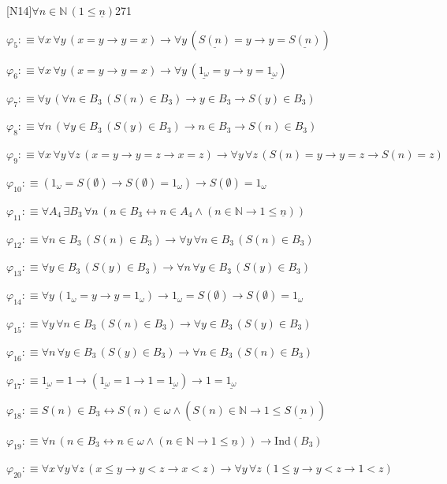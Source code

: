\begin{fullproof}{[N14]}{$\forall n \in \mathbb{N}\,(1 \leq \underline{n})$}{271}
\begin{abbrevlist}
\item $\varphi_{5} :\equiv \forall x\,\forall y\,(x = y \to y = x) \to \forall y\,(\underline{S(n)} = y \to y = \underline{S(n)})$
\item $\varphi_{6} :\equiv \forall x\,\forall y\,(x = y \to y = x) \to \forall y\,(\underline{1_{\omega}} = y \to y = \underline{1_{\omega}})$
\item $\varphi_{7} :\equiv \forall y\,(\forall n \in B_{3}\,(S(n) \in B_{3}) \to y \in B_{3} \to S(y) \in B_{3})$
\item $\varphi_{8} :\equiv \forall n\,(\forall y \in B_{3}\,(S(y) \in B_{3}) \to n \in B_{3} \to S(n) \in B_{3})$
\item $\varphi_{9} :\equiv \forall x\,\forall y\,\forall z\,(x = y \to y = z \to x = z) \to \forall y\,\forall z\,(S(n) = y \to y = z \to S(n) = z)$
\item $\varphi_{10} :\equiv (1_{\omega} = S(\emptyset) \to S(\emptyset) = 1_{\omega}) \to S(\emptyset) = 1_{\omega}$
\item $\varphi_{11} :\equiv \forall A_{4}\,\exists B_{3}\,\forall n\,(n \in B_{3} \leftrightarrow n \in A_{4} \land (n \in \mathbb{N} \to 1 \leq \underline{n}))$
\item $\varphi_{12} :\equiv \forall n \in B_{3}\,(S(n) \in B_{3}) \to \forall y\,\forall n \in B_{3}\,(S(n) \in B_{3})$
\item $\varphi_{13} :\equiv \forall y \in B_{3}\,(S(y) \in B_{3}) \to \forall n\,\forall y \in B_{3}\,(S(y) \in B_{3})$
\item $\varphi_{14} :\equiv \forall y\,(1_{\omega} = y \to y = 1_{\omega}) \to 1_{\omega} = S(\emptyset) \to S(\emptyset) = 1_{\omega}$
\item $\varphi_{15} :\equiv \forall y\,\forall n \in B_{3}\,(S(n) \in B_{3}) \to \forall y \in B_{3}\,(S(y) \in B_{3})$
\item $\varphi_{16} :\equiv \forall n\,\forall y \in B_{3}\,(S(y) \in B_{3}) \to \forall n \in B_{3}\,(S(n) \in B_{3})$
\item $\varphi_{17} :\equiv \underline{1_{\omega}} = 1 \to (\underline{1_{\omega}} = 1 \to 1 = \underline{1_{\omega}}) \to 1 = \underline{1_{\omega}}$
\item $\varphi_{18} :\equiv S(n) \in B_{3} \leftrightarrow S(n) \in \omega \land (S(n) \in \mathbb{N} \to 1 \leq \underline{S(n)})$
\item $\varphi_{19} :\equiv \forall n\,(n \in B_{3} \leftrightarrow n \in \omega \land (n \in \mathbb{N} \to 1 \leq \underline{n})) \to \mathrm{Ind}(B_{3})$
\item $\varphi_{20} :\equiv \forall x\,\forall y\,\forall z\,(x \leq y \to y < z \to x < z) \to \forall y\,\forall z\,(1 \leq y \to y < z \to 1 < z)$

\end{abbrevlist}
\end{fullproof}
